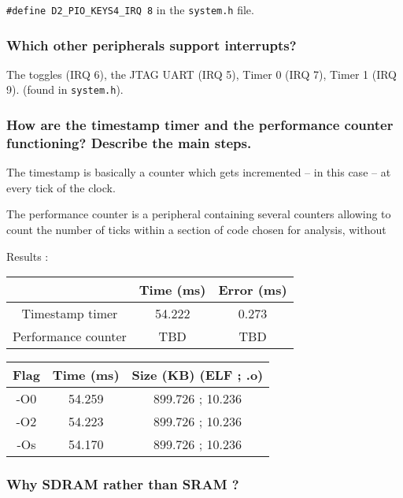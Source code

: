 \documentclass[a4paper,10pt]{article}
\begin{document}
\texttt{\#define D2\_PIO\_KEYS4\_IRQ 8} in the \texttt{system.h} file.

\subsubsection{Which other peripherals support interrupts?}

The toggles (IRQ 6), the JTAG UART (IRQ 5), Timer 0 (IRQ 7), Timer 1 (IRQ 9).
(found in \texttt{system.h}).


\setcounter{section}{5}
\setcounter{subsection}{1}
\setcounter{subsubsection}{0}

\subsubsection{How are the timestamp timer and the performance counter functioning? Describe the main steps.}

The timestamp is basically a counter which gets incremented -- in this case -- at every tick of the clock.

The performance counter is a peripheral containing several counters allowing to count the number of ticks within a section of code chosen for analysis, without 



Results :

\begin{tabular}{c||c|c}
    & Time (ms) & Error (ms) \\
    \hline
    \hline
    Timestamp timer & 54.222 & 0.273 \\
    \hline
    Performance counter & TBD & TBD
\end{tabular}



\begin{tabular}{c||c|c}
    Flag & Time (ms) & Size (KB) (ELF ; .o) \\
    \hline
    \hline
    -O0 & 54.259 & 899.726 ; 10.236 \\
    \hline
    -O2 & 54.223 & 899.726 ; 10.236\\
    \hline
    -Os & 54.170 & 899.726 ; 10.236
\end{tabular}

\setcounter{subsection}{3}
\setcounter{subsubsection}{0}

\subsubsection{Why SDRAM rather than SRAM ?}
\end{document}
